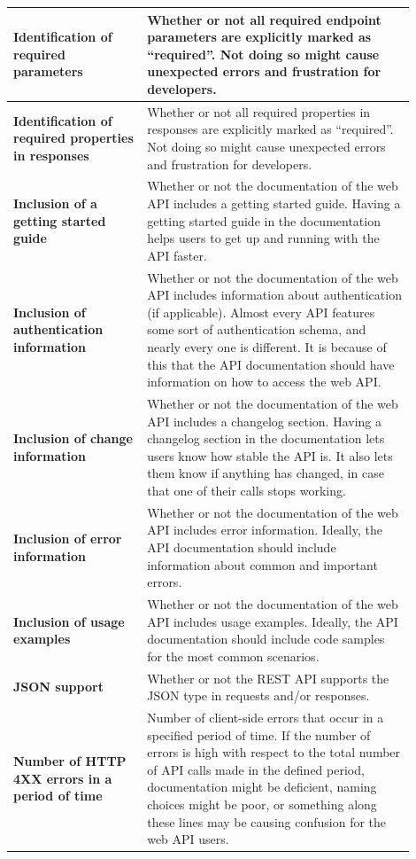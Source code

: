 \documentclass[12pt]{article}
\begin{document}
\begin{center}
{\begin{longtable}{p{0.3\linewidth}p{0.6\linewidth}}
			\hline
			\textbf{Identification of required parameters} & Whether or not all required endpoint parameters are explicitly marked as ``required''. Not doing so might cause unexpected errors and frustration for developers.\\
			\hline
			\textbf{Identification of required properties in responses} & Whether or not all required properties in responses are explicitly marked as ``required''. Not doing so might cause unexpected errors and frustration for developers.\\
			\hline
			\textbf{Inclusion of a getting started guide} & Whether or not the documentation of the web API includes a getting started guide. Having a getting started guide in the documentation helps users to get up and running with the API faster.\\
			\hline
			\textbf{Inclusion of authentication information} & Whether or not the documentation of the web API includes information about authentication (if applicable). Almost every API features some sort of authentication schema, and nearly every one is different. It is because of this that the API documentation should have information on how to access the web API.\\
			\hline
			\textbf{Inclusion of change information} & Whether or not the documentation of the web API includes a changelog section. Having a changelog section in the documentation lets users know how stable the API is. It also lets them know if anything has changed, in case that one of their calls stops working.\\
			\hline
			\textbf{Inclusion of error information} & Whether or not the documentation of the web API includes error information. Ideally, the API documentation should include information about common and important errors.\\
			\hline
			\textbf{Inclusion of usage examples} & Whether or not the documentation of the web API includes usage examples. Ideally, the API documentation should include code samples for the most common scenarios.\\
			\hline
			\textbf{JSON support} & Whether or not the REST API supports the JSON type in requests and/or responses.\\
			\hline
			\textbf{Number of HTTP 4XX errors in a period of time} & Number of client-side errors that occur in a specified period of time. If the number of errors is high with respect to the total number of API calls made in the defined period, documentation might be deficient, naming choices might be poor, or something along these lines may be causing confusion for the web API users.\\

\end{longtable}}
\end{center}
\end{document}

